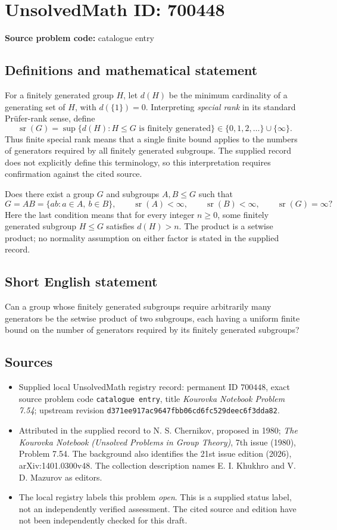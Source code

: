 \documentclass[11pt]{article}
\begin{document}
\section*{UnsolvedMath ID: 700448}
\textbf{Source problem code:} catalogue entry
\subsection{Definitions and mathematical statement}
For a finitely generated group \(H\), let \(d(H)\) be the minimum cardinality of a generating set of \(H\), with \(d(\{1\})=0\). Interpreting \emph{special rank} in its standard Prüfer-rank sense, define
\[
\operatorname{sr}(G)=\sup\{d(H):H\leq G\text{ is finitely generated}\}\in\{0,1,2,\ldots\}\cup\{\infty\}.
\]
Thus finite special rank means that a single finite bound applies to the numbers of generators required by all finitely generated subgroups. The supplied record does not explicitly define this terminology, so this interpretation requires confirmation against the cited source.

Does there exist a group \(G\) and subgroups \(A,B\leq G\) such that
\[
G=AB=\{ab:a\in A,\ b\in B\},\qquad
\operatorname{sr}(A)<\infty,\qquad
\operatorname{sr}(B)<\infty,\qquad
\operatorname{sr}(G)=\infty?
\]
Here the last condition means that for every integer \(n\geq0\), some finitely generated subgroup \(H\leq G\) satisfies \(d(H)>n\). The product is a setwise product; no normality assumption on either factor is stated in the supplied record.
\subsection{Short English statement}
Can a group whose finitely generated subgroups require arbitrarily many generators be the setwise product of two subgroups, each having a uniform finite bound on the number of generators required by its finitely generated subgroups?
\subsection{Sources}
\begin{itemize}
\item Supplied local UnsolvedMath registry record: permanent ID \(700448\), exact source problem code \texttt{catalogue entry}, title \emph{Kourovka Notebook Problem 7.54}; upstream revision \texttt{d371ee917ac9647fbb06cd6fc529deec6f3dda82}.
\item Attributed in the supplied record to N. S. Chernikov, proposed in 1980; \emph{The Kourovka Notebook (Unsolved Problems in Group Theory)}, 7th issue (1980), Problem 7.54. The background also identifies the 21st issue edition (2026), arXiv:1401.0300v48. The collection description names E. I. Khukhro and V. D. Mazurov as editors.
\item The local registry labels this problem \emph{open}. This is a supplied status label, not an independently verified assessment. The cited source and edition have not been independently checked for this draft.
\end{itemize}
\end{document}
